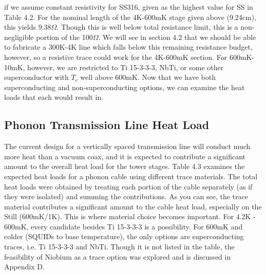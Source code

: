 \documentclass{report}
\begin{document}
if we assume constant resistivity for SS316, given as the highest value for SS in Table 4.2. For the nominal length of the 4K-600mK stage given above (9.24cm), this yields 9.38$\Omega$. Though this is well below total resistance limit, this is a non-negligible portion of the 100$\Omega$. We will see in section 4.2 that we should be able to fabricate a 300K-4K line which falls below this remaining resistance budget, however, so a resistive trace could work for the 4K-600mK section. For 600mK-10mK, however, we are restricted to Ti 15-3-3-3, NbTi, or some other superconductor with $T_c$ well above 600mK. Now that we have both superconducting and non-superconducting options, we can examine the heat loads that each would result in.

\subsection{Phonon Transmission Line Heat Load}

The current design for a vertically spaced transmission line will conduct much more heat than a vacuum coax, and it is expected to contribute a significant amount to the overall heat load for the tower stages. Table 4.3 examines the expected heat loads for a phonon cable using different trace materials\footnotemark. The total heat loads were obtained by treating each portion of the cable separately (as if they were isolated) and summing the contributions. As you can see, the trace material contributes a significant amount to the cable heat load, especially on the Still (600mK/1K). This is where material choice becomes important. For 4.2K - 600mK, every candidate besides Ti 15-3-3-3 is a possibility. For 600mK and colder (SQUIDs to base temperature), the only options are superconducting traces, i.e. Ti 15-3-3-3 and NbTi. Though it is not listed in the table, the feasibility of Niobium as a trace option was explored and is discussed in Appendix D.
\end{document}
